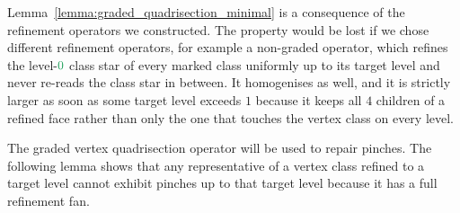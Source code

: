 \documentclass[a4paper, 12pt]{article}
\newcommand{\green}{\color{ForestGreen}}
\newcommand{\lzero}{{\green 0}}
\theoremstyle{definition}
\theoremstyle{plain}
\numberwithin{equation}{section}
\begin{document}
Lemma~\ref{lemma:graded_quadrisection_minimal} is a consequence of the refinement operators we constructed. The property would be lost if we chose different refinement operators, for example a non-graded operator, which refines the level-$\lzero$ class star of every marked class uniformly up to its target level and never re-reads the class star in between. It homogenises as well, and it is strictly larger as soon as some target level exceeds $1$ because it keeps all $4$ children of a refined face rather than only the one that touches the vertex class on every level.

\smallskip

The graded vertex quadrisection operator will be used to repair pinches. The following lemma shows that any representative of a vertex class refined to a target level cannot exhibit pinches up to that target level because it has a full refinement fan.
\end{document}
